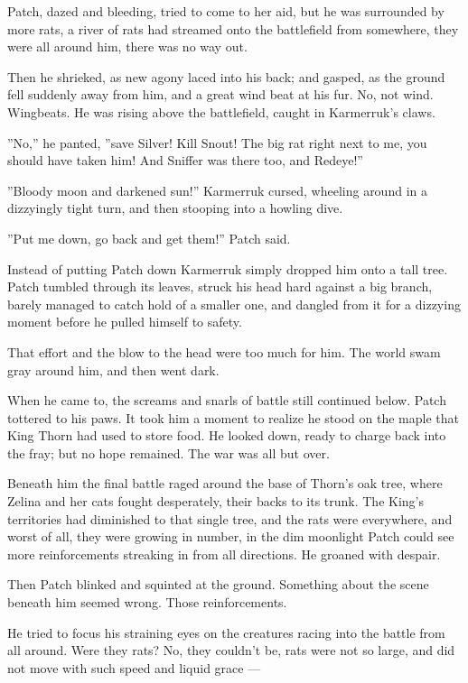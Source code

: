 \documentclass[12pt]{book}
\begin{document}
Patch, dazed and bleeding, tried to come to her aid, but he was
surrounded by more rats, a river of rats had streamed onto the
battlefield from somewhere, they were all around him, there was no way
out.

Then he shrieked, as new agony laced into his back; and gasped, as the
ground fell suddenly away from him, and a great wind beat at his
fur. No, not wind. Wingbeats. He was rising above the battlefield,
caught in Karmerruk's claws.

''No,'' he panted, ''save Silver! Kill Snout! The big rat right next
to me, you should have taken him! And Sniffer was there too, and
Redeye!''

''Bloody moon and darkened sun!'' Karmerruk cursed, wheeling around in
a dizzyingly tight turn, and then stooping into a howling dive.

''Put me down, go back and get them!'' Patch said.

Instead of putting Patch down Karmerruk simply dropped him onto a tall
tree. Patch tumbled through its leaves, struck his head hard against a
big branch, barely managed to catch hold of a smaller one, and dangled
from it for a dizzying moment before he pulled himself to safety.

That effort and the blow to the head were too much for him. The world
swam gray around him, and then went dark.

When he came to, the screams and snarls of battle still continued
below. Patch tottered to his paws. It took him a moment to realize he
stood on the maple that King Thorn had used to store food. He looked
down, ready to charge back into the fray; but no hope remained. The
war was all but over.

Beneath him the final battle raged around the base of Thorn's oak
tree, where Zelina and her cats fought desperately, their backs to its
trunk. The King's territories had diminished to that single tree, and
the rats were everywhere, and worst of all, they were growing in
number, in the dim moonlight Patch could see more reinforcements
streaking in from all directions. He groaned with despair.

Then Patch blinked and squinted at the ground. Something about the
scene beneath him seemed wrong. Those reinforcements.

He tried to focus his straining eyes on the creatures racing into the
battle from all around. Were they rats? No, they couldn't be, rats
were not so large, and did not move with such speed and liquid grace
---
\end{document}
